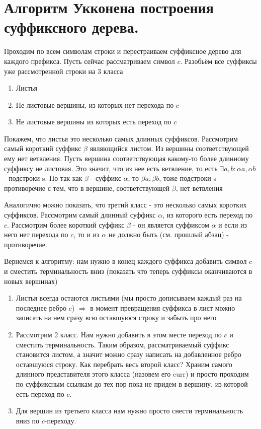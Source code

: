\section{Алгоритм Укконена построения суффиксного дерева.}
\par Проходим по всем символам строки и перестраиваем суффиксное дерево для каждого префикса. Пусть сейчас рассматриваем символ $c$. Разобьём все суффиксы уже рассмотренной строки на 3 класса
\begin{enumerate}
    \item Листья
    \item Не листовые вершины, из которых нет перехода по $c$
    \item Не листовые вершины из которых есть переход по $c$
\end{enumerate}
\par Покажем, что листья это несколько самых длинных суффиксов. Рассмотрим самый короткий суффикс $\beta$ являющийся листом. Из вершины соответствующей ему нет ветвления. Пусть вершина соответствующая какому-то более длинному суффиксу не листовая. Это значит, что из нее есть ветвление, то есть $\exists a, b: \alpha a, \alpha b$ - подстроки s. Но так как $\beta$ - суффикс $\alpha$, то $\beta a, \beta b$, тоже подстроки s - противоречие с тем, что в вершине, соответствующей $\beta$, нет ветвления
\par Аналогично можно показать, что третий класс - это несколько самых коротких суффиксов. Рассмотрим самый длинный суффикс $\alpha$, из которого есть переход по $c$. Рассмотрим более короткий суффикс $\beta$ - он является суффиксом $\alpha$ и если из него нет перехода по $c$, то и из $\alpha$ не должно быть (см. прошлый абзац) - противоречие.
\par Вернемся к алгоритму: нам нужно в конец каждого суффикса добавить символ $c$ и сместить терминальность вниз (показать что теперь суффиксы оканчиваются в новых вершинах)
\begin{enumerate}
    \item Листья всегда остаются листьями (мы просто дописываем каждый раз на последнее ребро $c$) $\Rightarrow$ в момент превращения суффикса в лист можно записать на нем сразу всю оставшуюся строку и забыть про него
    \item Рассмотрим 2 класс. Нам нужно добавить в этом месте переход по $c$ и сместить терминальность. Таким образом, рассматриваемый суффикс становится листом, а значит можно сразу написать на добавленное ребро оставшуюся строку. Как перебрать весь второй класс? Храним самого длинного представителя этого класса (назовем его curr) и просто проходим по суффиксным ссылкам до тех пор пока не придем в вершину, из которой есть переход по $c$.
    \item Для вершин из третьего класса нам нужно просто снести терминальность вниз по $c$-переходу.
\end{enumerate}
